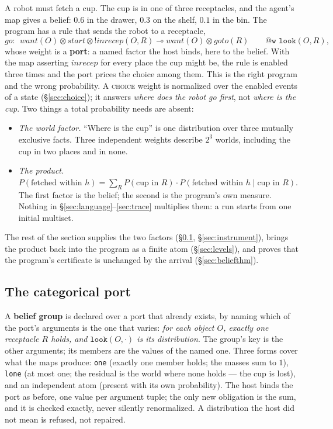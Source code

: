 \documentclass[11pt]{article}
\newcommand{\lolli}{\multimap}
\newcommand{\tensor}{\otimes}
\newcommand{\bang}{\mathord{!}}
\theoremstyle{plain}
\theoremstyle{definition}
\theoremstyle{remark}
\begin{document}
A robot must fetch a cup. The cup is in one of three receptacles, and
the agent's map gives a belief: $0.6$ in the drawer, $0.3$ on the shelf,
$0.1$ in the bin. The program has a rule that sends the robot to a
receptacle,
\[
  \mathit{go}:\ \ \mathit{want}(O) \tensor \mathit{start} \tensor
  \bang\mathit{inrecep}(O,R) \lolli \mathit{want}(O) \tensor
  \mathit{goto}(R) \qquad \texttt{@w look}(O,R),
\]
whose weight is a \textbf{port}: a named factor the host binds, here to
the belief. With the map asserting $\mathit{inrecep}$ for every place
the cup might be, the rule is enabled three times and the port prices
the choice among them. This is the right program and the wrong
probability. A \textsc{choice} weight is normalized over the enabled
events of a state (\S\ref{sec:choice}); it answers \emph{where does the
robot go first}, not \emph{where is the cup}. Two things a total
probability needs are absent:
\begin{itemize}[leftmargin=2em]
\item \emph{The world factor.} ``Where is the cup'' is one distribution
  over three mutually exclusive facts. Three independent weights describe
  $2^3$ worlds, including the cup in two places and in none.
\item \emph{The product.} $P(\text{fetched within } h) = \sum_R
  P(\text{cup in } R)\cdot P(\text{fetched within } h \mid \text{cup in }
  R)$. The first factor is the belief; the second is the program's own
  measure. Nothing in \S\ref{sec:language}--\ref{sec:trace} multiplies
  them: a run starts from one initial multiset.
\end{itemize}
The rest of the section supplies the two factors (\S\ref{sec:catport},
\S\ref{sec:instrument}), brings the product back into the program as a
finite atom (\S\ref{sec:levels}), and proves that the program's
certificate is unchanged by the arrival (\S\ref{sec:beliefthm}).

\subsection{The categorical port}\label{sec:catport}

A \textbf{belief group} is declared over a port that already exists, by
naming which of the port's arguments is the one that varies:
\emph{for each object $O$, exactly one receptacle $R$ holds, and
$\mathtt{look}(O,\cdot)$ is its distribution}. The group's key is the
other arguments; its members are the values of the named one. Three
forms cover what the maps produce: \texttt{one} (exactly one member
holds; the masses sum to $1$), \texttt{lone} (at most one; the residual
is the world where none holds --- the cup is lost), and an independent
atom (present with its own probability). The host binds the port as
before, one value per argument tuple; the only new obligation is the
sum, and it is checked exactly, never silently renormalized. A
distribution the host did not mean is refused, not repaired.
\end{document}
